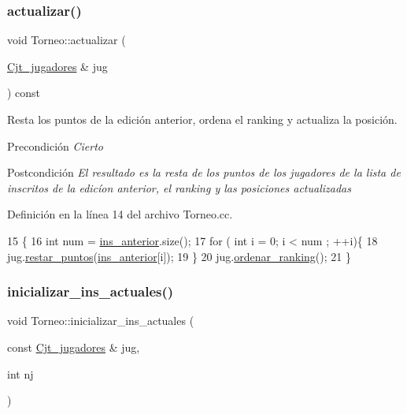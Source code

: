 \subsubsection{\texorpdfstring{actualizar()}{actualizar()}}
{\footnotesize\ttfamily void Torneo\+::actualizar (\begin{DoxyParamCaption}\item[{\hyperlink{class_cjt__jugadores}{Cjt\+\_\+jugadores} \&}]{jug }\end{DoxyParamCaption}) const}



Resta los puntos de la edición anterior, ordena el ranking y actualiza la posición. 

\begin{DoxyPrecond}{Precondición}
{\itshape Cierto{\itshape  }}
\end{DoxyPrecond}
\begin{DoxyPostcond}{Postcondición}
{\itshape {\itshape  El resultado es la resta de los puntos de los jugadores de la lista de inscritos de la edicíon anterior, el ranking y las posiciones actualizadas }}
\end{DoxyPostcond}


Definición en la línea 14 del archivo Torneo.\+cc.


\begin{DoxyCode}
15 \{
16   \textcolor{keywordtype}{int} num = \hyperlink{class_torneo_ad31e1a620a859ac6066eb6ca9de61e61}{ins\_anterior}.size();
17     \textcolor{keywordflow}{for} ( \textcolor{keywordtype}{int} i = 0; i < num ; ++i)\{
18         jug.\hyperlink{class_cjt__jugadores_a1940533810f2ea0b82c9a409b9ce6fab}{restar\_puntos}(\hyperlink{class_torneo_ad31e1a620a859ac6066eb6ca9de61e61}{ins\_anterior}[i]);
19     \}
20     jug.\hyperlink{class_cjt__jugadores_a61d4c0806dcd9973fe8da0af7d39d672}{ordenar\_ranking}();
21 \}
\end{DoxyCode}
\mbox{\label{class_torneo_a0d4f0e3c6128b5ca07dc74e88daf4da7}} 
\subsubsection{\texorpdfstring{inicializar\+\_\+ins\+\_\+actuales()}{inicializar\_ins\_actuales()}}
{\footnotesize\ttfamily void Torneo\+::inicializar\+\_\+ins\+\_\+actuales (\begin{DoxyParamCaption}\item[{const \hyperlink{class_cjt__jugadores}{Cjt\+\_\+jugadores} \&}]{jug,  }\item[{int}]{nj }\end{DoxyParamCaption})}




